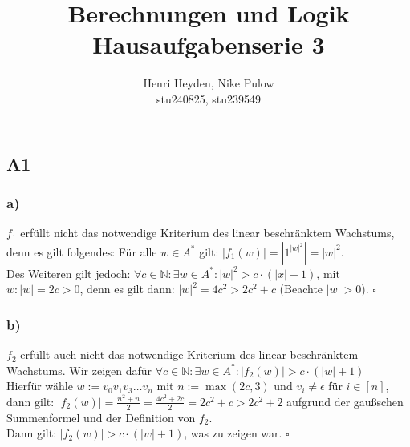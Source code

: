 \documentclass[12pt, a4paper]{article}
\title{Berechnungen und Logik\\Hausaufgabenserie 3}
\author{Henri Heyden, Nike Pulow \\ \small stu240825, stu239549}
\date{}
\newcommand*{\qed}{\null\nobreak\hfill\ensuremath{\square}}
\begin{document}
\maketitle

\doublespacing
\subsection*{A1}
\subsubsection*{a)}
\(f_1\) erfüllt nicht das notwendige Kriterium des linear beschränktem Wachstums, denn es gilt folgendes: Für alle \(w \in A^*\) gilt: \(|f_1(w)| = |1^{|w|^2}| = |w|^2\).\\
Des Weiteren gilt jedoch: \(\forall c \in \mathbb N: \exists w \in A^*: |w|^2 > c\cdot(|x| + 1)\), mit \(w : |w| = 2c > 0\), denn es gilt dann: \(|w|^2 = 4c^2 > 2c^2 + c\) (Beachte \(|w| > 0\)). \qed
\subsubsection*{b)}
\(f_2\) erfüllt auch nicht das notwendige Kriterium des linear beschränktem Wachstums. 
Wir zeigen dafür \(\forall c \in \mathbb N: \exists w \in A^*: |f_2(w)| > c\cdot(|w| + 1)\) \\
Hierfür wähle \(w := v_0v_1v_3 \dots v_n\) mit \(n := \max(2c, 3)\) und \(v_i \ne \epsilon\) für \(i \in [n]\), dann gilt: 
\(|f_2(w)| = \frac{n^2 + n}{2} = \frac{4c^2 + 2c}{2} = 2c^2+c > 2c^2 + 2\) aufgrund der gaußschen Summenformel und der Definition von \(f_2\).
\\Dann gilt: \(|f_2(w)| > c\cdot(|w| + 1)\), was zu zeigen war. \qed
\pagebreak
\end{document}
